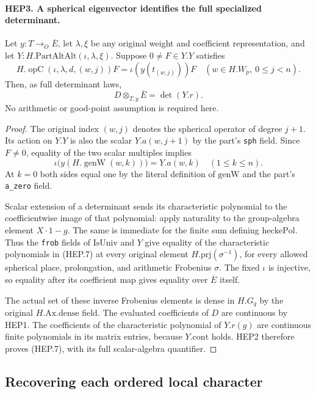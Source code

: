 \paragraph{HEP3. A spherical eigenvector identifies the full specialized determinant.}
\label{claim:HEP3}
Let $y:T\to_O\overline E$, let $\lambda,\xi$ be any original
weight and coefficient representation, and let
$Y:H.\mathrm{PartAltAlt}(\iota,\lambda,\xi)$.
Suppose $0\ne F\in Y.Y$ satisfies
\[
 H.\operatorname{opC}(\iota,\lambda,d,(w,j))F
       =\iota(y(t_{(w,j)}))F
       \quad(w\in H.W_p,\ 0\leq j<n).
 \tag{HEP.6}
\]
Then, as full determinant laws,
\[
                    D\otimes_{T,y}\overline E
                             =\det(Y.r).
 \tag{HEP.7}
\]
No arithmetic or good-point assumption is required here.
\begin{proof}
The original index $(w,j)$ denotes the spherical operator of
degree $j+1$.  Its action on $Y.Y$ is also the scalar
$Y.a(w,j+1)$ by the part's \texttt{sph} field.
Since $F\ne0$, equality of the two scalar multiples implies
\[
       \iota\bigl(y(H.\operatorname{genW}(w,k))\bigr)=Y.a(w,k)
                                      \quad(1\leq k\leq n).
\]
At $k=0$ both sides equal one by the literal definition of
$\mathrm{genW}$ and the part's \texttt{a\_zero} field.

Scalar extension of a determinant sends its characteristic
polynomial to the coefficientwise image of that polynomial:
apply naturality to the group-algebra element $X\cdot1-g$.
The same is immediate for the finite sum defining
$\mathrm{heckePol}$.  Thus the \texttt{frob} fields of
$\mathrm{IsUniv}$ and $Y$ give equality of the characteristic
polynomials in (HEP.7) at every original element
$H.\mathrm{prj}(\sigma^{-1})$, for every allowed spherical place,
prolongation, and arithmetic Frobenius $\sigma$.
The fixed $\iota$ is injective, so equality after its coefficient
map gives equality over $\overline E$ itself.

The actual set of these inverse Frobenius elements is dense in
$H.G_q$ by the original $H.\mathrm{Ax.dense}$ field.
The evaluated coefficients of $D$ are continuous by HEP1.
The coefficients of the characteristic polynomial of $Y.r(g)$
are continuous finite polynomials in its matrix entries, because
$Y.\mathrm{cont}$ holds.  HEP2 therefore proves (HEP.7), with
its full scalar-algebra quantifier.
\end{proof}

\subsection{Recovering each ordered local character}


